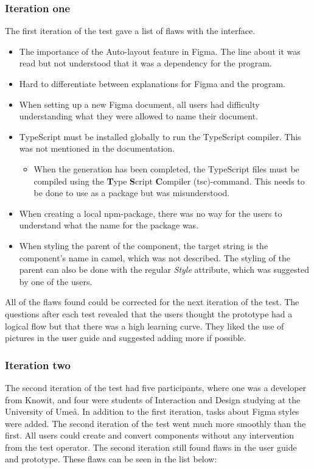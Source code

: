 \subsubsection{Iteration one}%
\label{ssub:Iteration one}
The first iteration of the test gave a list of flaws with the interface.
\begin{itemize}
   \item The importance of the Auto-layout feature in Figma. The line about it was read but not understood that it was a dependency for the program. 
   \item Hard to differentiate between explanations for Figma and the program.
   \item When setting up a new Figma document, all users had difficulty understanding what they were allowed to name their document. 
   \item TypeScript must be installed globally to run the TypeScript compiler. This was not mentioned in the documentation. 
      \begin{itemize}
         \item When the generation has been completed, the TypeScript files must be compiled using the \textbf{T}ype \textbf{S}cript \textbf{C}ompiler (tsc)-command. This needs to be done to use as a package but was misunderstood.
      \end{itemize}
   \item When creating a local \acrshort{npm}-package, there was no way for the users to understand what the name for the package was. 
   \item When styling the parent of the component, the target string is the component's name in \gls{camel}, which was not described. The styling of the parent can also be done with the regular \textit{Style} attribute, which was suggested by one of the users.
\end{itemize}

All of the flaws found could be corrected for the next iteration of the test. The questions after each test revealed that the users thought the prototype had a logical flow but that there was a high learning curve. They liked the use of pictures in the user guide and suggested adding more if possible.  

\subsubsection{Iteration two}%
\label{ssub:Iteration two}
The second iteration of the test had five participants, where one was a developer from Knowit, and four were students of Interaction and Design studying at the University of Umeå. In addition to the first iteration, tasks about Figma styles were added. The second iteration of the test went much more smoothly than the first. All users could create and convert components without any intervention from the test operator. The second iteration still found flaws in the user guide and prototype. These flaws can be seen in the list below:


